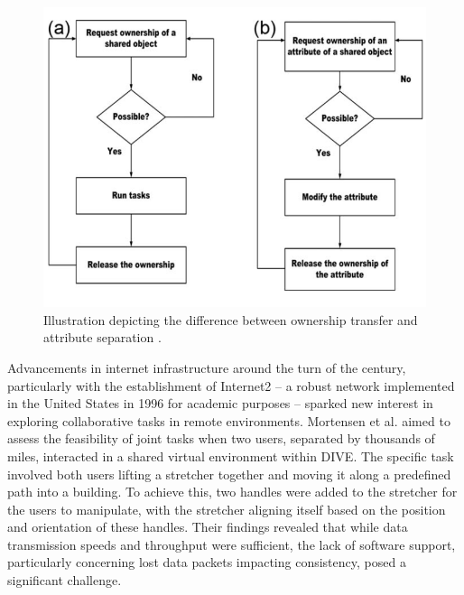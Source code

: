    \begin{figure}[h!]
        \centering
        \includegraphics[width=0.65\linewidth]{owner_vs_attr_2.png}
        \caption{Illustration depicting the difference between ownership transfer and attribute separation \cite{leeSupportingFineGrainedConcurrent2012}.}
        \label{fig:enter-label}
    \end{figure}

    Advancements in internet infrastructure around the turn of the century, particularly with the establishment of Internet2 \cite{yeungInternetScalingBackbone1997} -- a robust network implemented in the United States in 1996 for academic purposes -- sparked new interest in exploring collaborative tasks in remote environments. Mortensen et al. \cite{mortensenCollaborationTeleImmersiveEnvironments2002} aimed to assess the feasibility of joint tasks when two users, separated by thousands of miles, interacted in a shared virtual environment within DIVE. The specific task involved both users lifting a stretcher together and moving it along a predefined path into a building. To achieve this, two handles were added to the stretcher for the users to manipulate, with the stretcher aligning itself based on the position and orientation of these handles. Their findings revealed that while data transmission speeds and throughput were sufficient, the lack of software support, particularly concerning lost data packets impacting consistency, posed a significant challenge.

